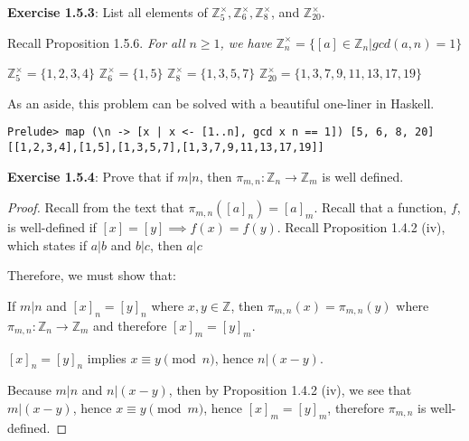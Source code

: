 \documentclass[a4paper]{article}
\begin{document}
\begin{myparindent}{0pt}
\textbf{Exercise 1.5.3}:
List all elements of $\mathbb{Z}_5^\times, \mathbb{Z}_6^\times, \mathbb{Z}_8^\times$, and $\mathbb{Z}_{20}^\times$.
\newline

Recall Proposition 1.5.6. \textit{For all $n \ge 1$, we have} $\mathbb{Z}_n^\times = \{ [a] \in \mathbb{Z}_n | gcd(a, n) = 1 \}$ \newline

$\mathbb{Z}_5^\times = \{ 1, 2, 3, 4 \}$ \newline
$\mathbb{Z}_6^\times = \{ 1, 5 \}$ \newline
$\mathbb{Z}_8^\times = \{ 1, 3, 5, 7 \}$ \newline
$\mathbb{Z}_{20}^\times = \{ 1, 3, 7, 9, 11, 13, 17, 19 \}$ \newline

As an aside, this problem can be solved with a beautiful one-liner in Haskell. \
\begin{verbatim}
Prelude> map (\n -> [x | x <- [1..n], gcd x n == 1]) [5, 6, 8, 20]
[[1,2,3,4],[1,5],[1,3,5,7],[1,3,7,9,11,13,17,19]]
\end{verbatim}

\textbf{Exercise 1.5.4}:
Prove that if $m|n$, then $\pi_{m, n}: \mathbb{Z}_n \rightarrow \mathbb{Z}_m$ is well defined.

\begin{proof}

Recall from the text that $\pi_{m, n}([a]_n) = [a]_m$.
Recall that a function, $f$, is well-defined if $[x] = [y] \implies f(x) = f(y)$.
Recall Proposition 1.4.2 (iv), which states if $a|b$ and $b|c$, then $a|c$ \newline

Therefore, we must show that: \newline

If $m | n$ and $[x]_n = [y]_n$ where $x, y \in \mathbb{Z}$, then
$\pi_{m, n}(x) = \pi_{m, n}(y)$ where $\pi_{m, n}: \mathbb{Z}_n \rightarrow \mathbb{Z}_m$
and therefore $[x]_m = [y]_m$. \newline

$[x]_n = [y]_n$ implies $x \equiv y \pmod{n}$, hence $n | (x - y)$. \newline

Because $m | n$ and $n | (x - y)$, then by Proposition 1.4.2 (iv), we see that
$m | (x - y)$, hence $x \equiv y \pmod{m}$, hence $[x]_m = [y]_m$,
therefore $\pi_{m, n}$ is well-defined.

\end{proof}

\end{myparindent}
\end{document}
